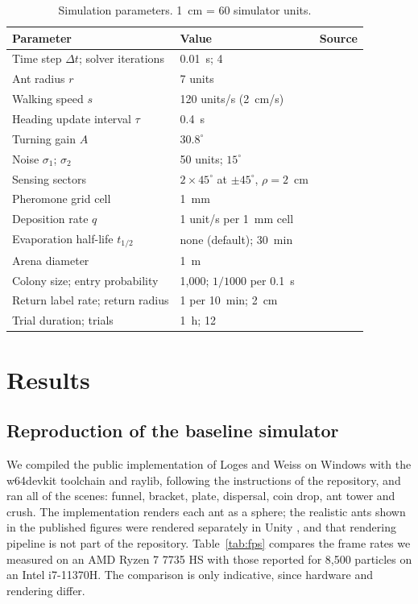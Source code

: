 \documentclass[9pt,twoside]{pnas-new}
\begin{document}
\begin{table}[t]
\centering
\caption{Simulation parameters. 1~cm = 60 simulator units.}
\label{tab:params}
\begin{tabular}{lll}
\toprule
Parameter & Value & Source \\
\midrule
Time step $\Delta t$; solver iterations & 0.01~s; 4 & \cite{loges2025} \\
Ant radius $r$ & 7 units & \cite{loges2025} \\
Walking speed $s$ & 120 units/s (2~cm/s) & \cite{loges2025,perna2012} \\
Heading update interval $\tau$ & 0.4~s & \cite{perna2012} \\
Turning gain $A$ & $30.8^\circ$ & \cite{perna2012} \\
Noise $\sigma_1$; $\sigma_2$ & 50 units; $15^\circ$ & \cite{perna2012} \\
Sensing sectors & $2 \times 45^\circ$ at $\pm 45^\circ$, $\rho = 2$~cm & \cite{perna2012} \\
Pheromone grid cell & 1~mm & \cite{perna2012} \\
Deposition rate $q$ & 1 unit/s per 1~mm cell & \cite{perna2012} \\
Evaporation half-life $t_{1/2}$ & none (default); 30~min & \cite{perna2012} \\
Arena diameter & 1~m & \cite{perna2012} \\
Colony size; entry probability & 1{,}000; $1/1000$ per 0.1~s & \cite{perna2012} \\
Return label rate; return radius & 1 per 10~min; 2~cm & \cite{perna2012} \\
Trial duration; trials & 1~h; 12 & \cite{perna2012} \\
\bottomrule
\end{tabular}
\end{table}







\section{Results}

\subsection{Reproduction of the baseline simulator}
We compiled the public implementation of Loges and Weiss \cite{loges2025} on Windows with the w64devkit toolchain and raylib, following the instructions of the repository, and ran all of the scenes: funnel, bracket, plate, dispersal, coin drop, ant tower and crush. The implementation renders each ant as a sphere; the realistic ants shown in the published figures were rendered separately in Unity \cite{loges2025}, and that rendering pipeline is not part of the repository. Table~\ref{tab:fps} compares the frame rates we measured on an AMD Ryzen 7 7735 HS with those reported for 8{,}500 particles on an Intel i7-11370H. The comparison is only indicative, since hardware and rendering differ.
\end{document}
